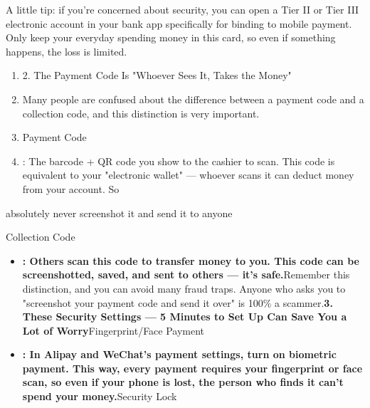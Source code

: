 


A little tip: if you're concerned about security, you can open a Tier II or Tier III electronic account in your bank app specifically for binding to mobile payment. Only keep your everyday spending money in this card, so even if something happens, the loss is limited.

\begin{enumerate}
  \item 2. The Payment Code Is "Whoever Sees It, Takes the Money"
  \item Many people are confused about the difference between a payment code and a collection code, and this distinction is very important.
  \item Payment Code
  \item : The barcode + QR code you show to the cashier to scan. This code is equivalent to your "electronic wallet" — whoever scans it can deduct money from your account. So
\end{enumerate}

absolutely never screenshot it and send it to anyone


Collection Code

\begin{itemize}
  \item \textbf{: Others scan this code to transfer money to you. This code can be screenshotted, saved, and sent to others — it's safe.}Remember this distinction, and you can avoid many fraud traps. Anyone who asks you to "screenshot your payment code and send it over" is 100\% a scammer.\textbf{3. These Security Settings — 5 Minutes to Set Up Can Save You a Lot of Worry}Fingerprint/Face Payment
  \item \textbf{: In Alipay and WeChat's payment settings, turn on biometric payment. This way, every payment requires your fingerprint or face scan, so even if your phone is lost, the person who finds it can't spend your money.}Security Lock
\end{itemize}

